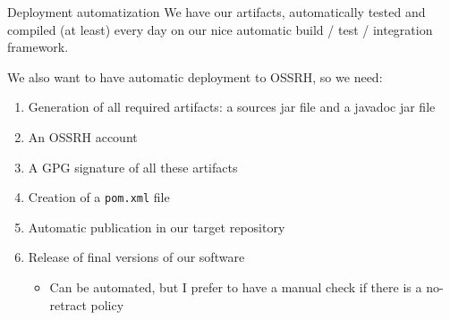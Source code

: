 \documentclass[presentation]{beamer}
\begin{document}
\begin{frame}[fragile]{Deployment automatization}
	We have our artifacts, automatically tested and compiled (at least) every day on our nice automatic build / test / integration framework.
	
	We also want to have automatic deployment to OSSRH, so we need:
	\begin{enumerate}
		\item Generation of all required artifacts: a sources jar file and a javadoc jar file
		\item An OSSRH account
		\item A GPG signature of all these artifacts
		\item Creation of a \texttt{pom.xml} file
		\item Automatic publication in our target repository
		\item Release of final versions of our software
		\begin{itemize}
			\item Can be automated, but I prefer to have a manual check if there is a no-retract policy
		\end{itemize}
	\end{enumerate}
\end{frame}

\end{document}
